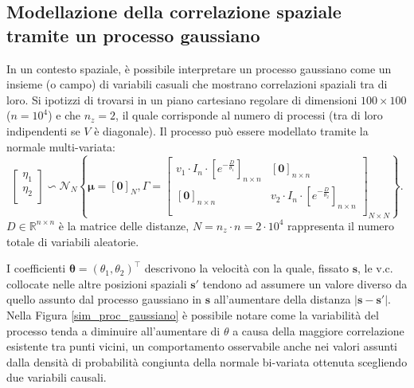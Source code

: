 \subsection[Modellazione della correlazione spaziale tramite un processo gaussiano]{Modellazione della correlazione spaziale tramite un processo gaussiano}
In un contesto spaziale, è possibile interpretare un processo gaussiano come un insieme (o campo) di variabili casuali che mostrano correlazioni spaziali tra di loro. Si ipotizzi di trovarsi in un piano cartesiano regolare di dimensioni $100\times100$ ($n=10^4$) e che $n_z =2$, il quale corrisponde al numero di processi (tra di loro indipendenti se $V$ è diagonale). Il processo può essere modellato tramite la normale multi-variata:
\[
	\begin{bmatrix}
		\eta_1 \\
		\eta_2 \\
	\end{bmatrix}\backsim \mathcal{N}_N\left\{\boldsymbol{\mu}=[\mathbf{0}]_{N}, \Gamma = 
	\begin{bmatrix}
		v_1\cdot I_{n}\cdot [e^{-\frac{D}{\theta_1}}]_{n\times n} & [\mathbf{0}]_{n\times n} \\
		[\mathbf{0}]_{n\times n} & v_2\cdot I_{n}\cdot [e^{-\frac{D}{\theta_2}}]_{n\times n} \\
	\end{bmatrix}_{N\times N}
	\right\}.
\]
$D\in\mathbb{R}^{n\times n}$ è la matrice delle distanze, $N=n_z\cdot n = 2\cdot 10^4$ rappresenta il numero totale di variabili aleatorie.
\par I coefficienti $\boldsymbol{\theta} = (\theta_1,\theta_2)^\top$ descrivono la velocità con la quale, fissato $\mathbf{s}$, le v.c. collocate nelle altre posizioni spaziali $\mathbf{s}'$ tendono ad assumere un valore diverso da quello assunto dal processo gaussiano in $\mathbf{s}$ all'aumentare della distanza $|\mathbf{s} - \mathbf{s}'|$. Nella Figura \ref{sim_proc_gaussiano} è possibile notare come la variabilità del processo tenda a diminuire all'aumentare di $\theta$ a causa della maggiore correlazione esistente tra punti vicini, un comportamento osservabile anche nei valori assunti dalla densità di probabilità congiunta della normale bi-variata ottenuta scegliendo due variabili causali.

